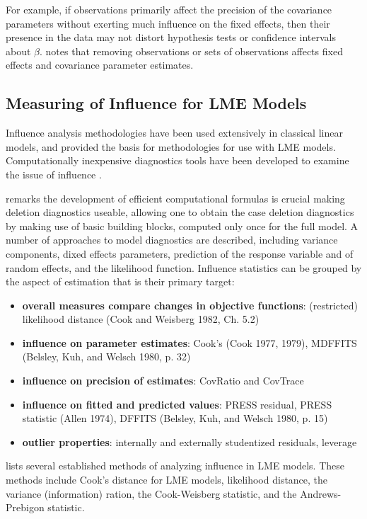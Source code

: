 \documentclass[12pt, a4paper]{report}
\theoremstyle{plain}
\theoremstyle{definition}
\theoremstyle{remark}
\begin{document}
	

	
	For example, if observations primarily affect the precision of the covariance parameters without exerting much influence on the fixed effects, then their presence in the data may not distort hypothesis
	tests or confidence intervals about $\beta$. 
	\citet{schabenberger} notes that removing observations or sets of observations affects fixed effects and covariance parameter estimates.
	
	
	
	
\newpage	
\subsection{Measuring of Influence for LME Models}
Influence analysis methodologies have been used extensively in classical linear models, and provided the basis for methodologies for use with LME models. Computationally inexpensive diagnostics tools have been developed to examine the issue of influence \citep{Zewotir}. 


\citet{Zewotir} remarks the development of efficient computational formulas is crucial making deletion diagnostics useable, allowing one to obtain the  case deletion diagnostics by making use of basic building blocks, computed only once for the full model. A number of approaches to model diagnostics are described, including variance components, dixed effects parameters, prediction of the response variable and of random effects, and the likelihood function. Influence statistics can be grouped by the aspect of estimation that is their primary target:
\begin{itemize}
	\item \textbf{overall measures compare changes in objective functions}: (restricted) likelihood distance (Cook and Weisberg 1982, Ch. 5.2)
	\item \textbf{influence on parameter estimates}: Cook's  (Cook 1977, 1979), MDFFITS (Belsley, Kuh, and Welsch 1980, p. 32)
	\item \textbf{influence on precision of estimates}: CovRatio and CovTrace
	\item \textbf{influence on fitted and predicted values}: PRESS residual, PRESS statistic (Allen 1974), DFFITS (Belsley, Kuh, and Welsch 1980, p. 15)
	\item \textbf{outlier properties}: internally and externally studentized residuals, leverage
\end{itemize}


\citet{Zewotir} lists several established methods of analyzing influence in LME models. These methods include Cook's distance for LME models,
 likelihood distance,
the variance (information) ration,
the  Cook-Weisberg statistic, and
the  Andrews-Prebigon statistic.
\end{document}
